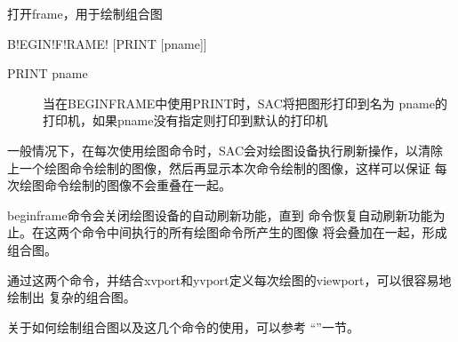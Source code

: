 \label{cmd:beginframe}

打开frame，用于绘制组合图

\begin{SACSTX}
B!EGIN!F!RAME! [PRINT [pname]]
\end{SACSTX}

\begin{description}
\item [PRINT pname] 当在BEGINFRAME中使用PRINT时，SAC将把图形打印到名为
    pname的打印机，如果pname没有指定则打印到默认的打印机
\end{description}

一般情况下，在每次使用绘图命令时，SAC会对绘图设备执行刷新操作，以清除
上一个绘图命令绘制的图像，然后再显示本次命令绘制的图像，这样可以保证
每次绘图命令绘制的图像不会重叠在一起。

beginframe命令会关闭绘图设备的自动刷新功能，直到 
命令恢复自动刷新功能为止。在这两个命令中间执行的所有绘图命令所产生的图像
将会叠加在一起，形成组合图。

通过这两个命令，并结合xvport和yvport定义每次绘图的viewport，可以很容易地绘制出
复杂的组合图。

关于如何绘制组合图以及这几个命令的使用，可以参考 ``''一节。
